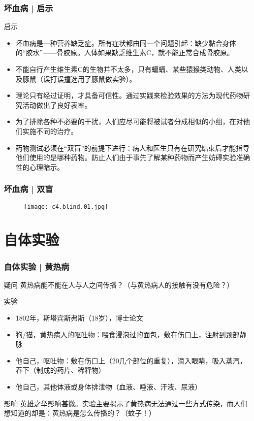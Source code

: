 \begin{frame}
  \frametitle{坏血病 | 启示}
  \begin{block}{启示}
  \begin{itemize}
    \item 坏血病是一种营养缺乏症。所有症状都由同一个问题引起：缺少黏合身体的“胶水”——骨胶原。人体如果缺乏维生素C，就不能正常合成骨胶原。
    \item 不能自行产生维生素C的生物并不太多，只有蝙蝠、某些猿猴类动物、人类以及豚鼠（误打误撞选用了豚鼠做实验）。
    \item 理论只有经过证明，才具备可信性。通过实践来检验效果的方法为现代药物研究活动做出了良好表率。
    \item 为了排除各种不必要的干扰，人们应尽可能将被试者分成相似的小组，在对他们实施不同的治疗。
    \item 药物测试必须在“双盲”的前提下进行：病人和医生只有在研究结束后才能指导他们使用的是哪种药物。防止人们由于事先了解某种药物而产生妨碍实验准确性的心理暗示。 
  \end{itemize}
  \end{block}
\end{frame}

\begin{frame}
  \frametitle{坏血病 | 双盲}
  \begin{figure}
    \centering
    \texttt{[image: c4.blind.01.jpg]}
  \end{figure}
\end{frame}

\section{自体实验}
\begin{frame}
  \frametitle{自体实验 | 黄热病}
  \begin{block}{疑问}
    黄热病能不能在人与人之间传播？（与黄热病人的接触有没有危险？）
  \end{block}
  \pause
  \begin{block}{实验}
    \begin{itemize}
      \item 1802年，斯塔宾斯\textbullet 弗斯（18岁），博士论文
      \item 狗/猫，黄热病人的呕吐物：喂食浸泡过的面包，敷在伤口上，注射到颈部静脉
      \item 他自己，呕吐物：敷在伤口上（20几个部位的重复），滴入眼睛，吸入蒸汽，吞下（制成的药片、稀释物）
      \item 他自己，其他体液或身体排泄物（血液、唾液、汗液、尿液）
    \end{itemize}
  \end{block}
  \pause
  \begin{block}{影响}
英雄之举影响甚微。实验主要揭示了黄热病无法通过一些方式传染，而人们想知道的却是：黄热病是怎么传播的？（蚊子！）
  \end{block}
\end{frame}

